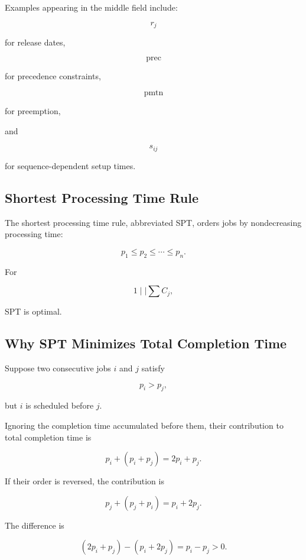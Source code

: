 Examples appearing in the middle field include:

\[
\boxed{
r_j
}
\]

for release dates,

\[
\boxed{
\mathrm{prec}
}
\]

for precedence constraints,

\[
\boxed{
\mathrm{pmtn}
}
\]

for preemption,

and

\[
\boxed{
s_{ij}
}
\]

for sequence-dependent setup times.

\subsection{Shortest Processing Time Rule}
\label{subsec:spt-rule}

The shortest processing time rule, abbreviated SPT, orders jobs by
nondecreasing processing time:

\[
\boxed{
p_1
\leq
p_2
\leq
\cdots
\leq
p_n.
}
\]

For

\[
\boxed{
1\mid\mid\sum C_j,
}
\]

SPT is optimal.

\subsection{Why SPT Minimizes Total Completion Time}
\label{subsec:spt-proof}

Suppose two consecutive jobs \(i\) and \(j\) satisfy

\[
p_i>p_j,
\]

but \(i\) is scheduled before \(j\).

Ignoring the completion time accumulated before them, their contribution
to total completion time is

\[
p_i
+
(p_i+p_j)
=
2p_i+p_j.
\]

If their order is reversed, the contribution is

\[
p_j
+
(p_j+p_i)
=
p_i+2p_j.
\]

The difference is

\[
(2p_i+p_j)
-
(p_i+2p_j)
=
p_i-p_j
>
0.
\]

